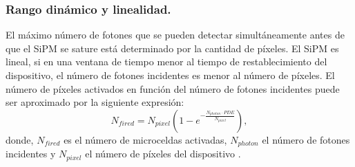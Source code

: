 \subsubsection{Rango dinámico y linealidad.}
El máximo número de fotones que se pueden detectar simultáneamente antes de que el SiPM se sature está determinado por la cantidad de píxeles. El SiPM es lineal, si en una ventana de tiempo menor al tiempo de restablecimiento del dispositivo, el número de fotones incidentes es menor al número de píxeles. El número de píxeles activados en función del número de fotones incidentes puede ser aproximado por la siguiente expresión:
\begin{equation}
    N_{fired}=N_{pixel}\left (1-e^{-\frac{N_{photon}\cdot PDE}{N_{pixel}}}\right),
    \label{rangoDinamico}
\end{equation}
donde, $N_{fired}$ es el número de microceldas activadas, $N_{photon}$ el número de fotones incidentes y $N_{pixel}$ el número de píxeles del dispositivo \citep{Apd_Hamamatsu}.
